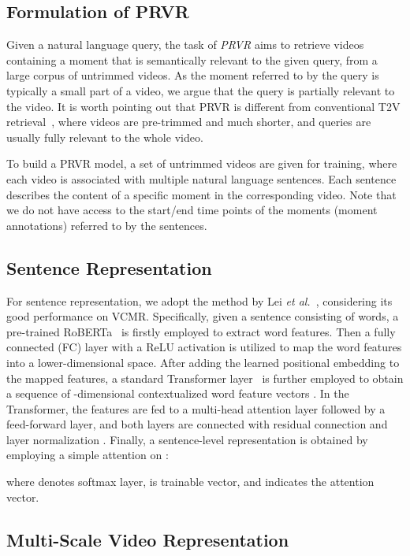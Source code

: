\documentclass[sigconf]{acmart}
\newcommand{\etal}{\emph{et al.}~}
\begin{document}
\subsection{Formulation of PRVR}

Given a natural language query, the task of \textit{PRVR} aims to retrieve videos containing a moment that is semantically relevant to the given query, from a large corpus of untrimmed videos.
As the moment referred to by the query is typically a small part of a video, we argue that the query is partially relevant to the video.
It is worth pointing out that PRVR is different from conventional T2V retrieval~\cite{dong2019dual,chen2020fine,han2021fine}, where videos are pre-trimmed and much shorter, and queries are usually fully relevant to the whole video.

To build a PRVR model, a set of untrimmed videos are given for training, where each video is associated with multiple natural language sentences. Each sentence describes the content of a specific moment in the corresponding video. Note that we do not have access to the start/end time points of the moments (moment annotations) referred to by the sentences.

\subsection{Sentence Representation} \label{ssec:sent-rep}


For sentence representation, we adopt the method by Lei \etal \cite{lei2020tvr}, considering its good performance on VCMR.
Specifically, given a sentence consisting of  words, a pre-trained RoBERTa~\cite{liu2019roberta} is firstly employed to extract word features.
Then a fully connected (FC) layer with a ReLU activation is utilized to map the word features into a lower-dimensional space.
After adding the learned positional embedding to the mapped features, a standard Transformer layer~\cite{vaswani2017attention} is further employed to obtain a sequence of -dimensional contextualized word feature vectors . 
In the Transformer, the features are fed to a multi-head attention layer followed by a feed-forward layer, and both layers are connected with residual connection \cite{he2016deep} and layer normalization \cite{ba2016layer}.
Finally, a sentence-level representation  is obtained by employing a simple attention on :

where  denotes softmax layer,  is trainable vector, and  indicates the attention vector.


\subsection{Multi-Scale Video Representation}
\end{document}
